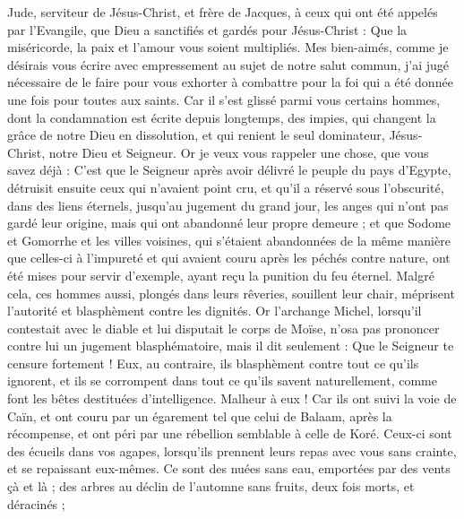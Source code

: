 \begin{multicols}{2}
\VerseOne{}Jude, serviteur de Jésus-Christ, et frère de Jacques, à ceux qui ont été appelés par l'Evangile, que Dieu a sanctifiés et gardés pour Jésus-Christ :
Que la miséricorde, la paix et l'amour vous soient multipliés.
Mes bien-aimés, comme je désirais vous écrire avec empressement au sujet de notre salut commun, j'ai jugé nécessaire de le faire pour vous exhorter à combattre pour la foi qui a été donnée une fois pour toutes aux saints.
Car il s'est glissé parmi vous certains hommes, dont la condamnation est écrite depuis longtemps, des impies, qui changent la grâce de notre Dieu en dissolution, et qui renient le seul dominateur, Jésus-Christ, notre Dieu et Seigneur.
Or je veux vous rappeler une chose, que vous savez déjà : C'est que le Seigneur après avoir délivré le peuple du pays d'Egypte, détruisit ensuite ceux qui n'avaient point cru,
et qu'il a réservé sous l'obscurité, dans des liens éternels, jusqu'au jugement du grand jour, les anges qui n'ont pas gardé leur origine, mais qui ont abandonné leur propre demeure ;
et que Sodome et Gomorrhe et les villes voisines, qui s'étaient abandonnées de la même manière que celles-ci à l'impureté et qui avaient couru après les péchés contre nature, ont été mises pour servir d'exemple, ayant reçu la punition du feu éternel. 
Malgré cela, ces hommes aussi, plongés dans leurs rêveries, souillent leur chair, méprisent l'autorité et blasphèment contre les dignités.
Or l'archange Michel, lorsqu'il contestait avec le diable et lui disputait le corps de Moïse, n'osa pas prononcer contre lui un jugement blasphématoire, mais il dit seulement : Que le Seigneur te censure fortement !
Eux, au contraire, ils blasphèment contre tout ce qu'ils ignorent, et ils se corrompent dans tout ce qu'ils savent naturellement, comme font les bêtes destituées d'intelligence.
Malheur à eux ! Car ils ont suivi la voie de Caïn, et ont couru par un égarement tel que celui de Balaam, après la récompense, et ont péri par une rébellion semblable à celle de Koré.
Ceux-ci sont des écueils dans vos agapes, lorsqu'ils prennent leurs repas avec vous sans crainte, et se repaissant eux-mêmes. Ce sont des nuées sans eau, emportées par des vents çà et là ; des arbres au déclin de l'automne sans fruits, deux fois morts, et déracinés ;

\end{multicols}
